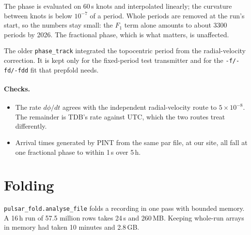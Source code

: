 \documentclass[11pt,a4paper]{article}
\newcommand{\code}[1]{\texttt{#1}}
\begin{document}
The phase is evaluated on 60\,s knots and interpolated linearly; the curvature between knots is below $10^{-7}$ of a period. Whole periods are removed at the run's start, so the numbers stay small: the $F_1$ term alone amounts to about 3300 periods by 2026. The fractional phase, which is what matters, is unaffected.

The older \code{phase\_track} integrated the topocentric period from the radial-velocity correction. It is kept only for the fixed-period test transmitter and for the \code{-f/-fd/-fdd} fit that prepfold needs.

\paragraph{Checks.}
\begin{itemize}
\item The rate $d\phi/dt$ agrees with the independent radial-velocity route to $5\times10^{-8}$. The remainder is TDB's rate against UTC, which the two routes treat differently.
\item Arrival times generated by PINT from the same par file, at our site, all fall at one fractional phase to within 1\,\textmu s over 5\,h.
\end{itemize}

\section{Folding}
\label{sec:fold}

\code{pulsar\_fold.analyse\_file} folds a recording in one pass with bounded memory. A 16\,h run of 57.5 million rows takes 24\,s and 260\,MB. Keeping whole-run arrays in memory had taken 10 minutes and 2.8\,GB.
\end{document}
